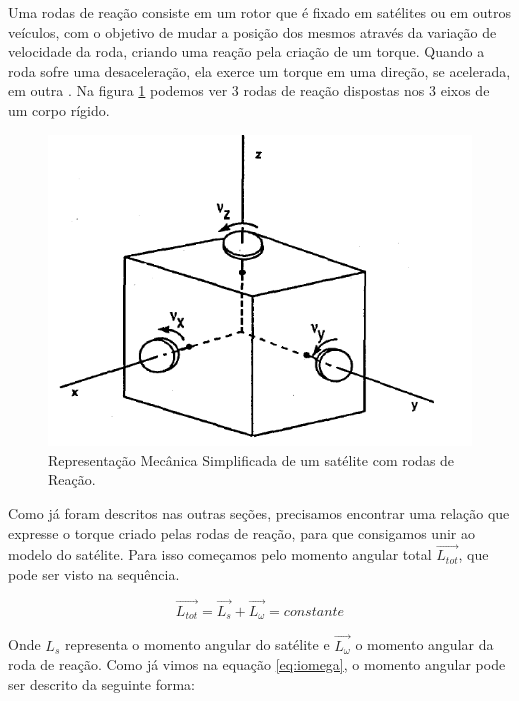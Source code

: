 Uma rodas de reação consiste em um rotor que é fixado em satélites ou em outros veículos, com o objetivo de mudar a posição dos mesmos através da variação de velocidade da roda, criando uma reação pela criação de um torque. Quando a roda sofre uma desaceleração, ela exerce um torque em uma direção, se acelerada, em outra \cite{BongWie2001}. Na figura \ref{fig:satellite_controlhand_p1306} podemos ver 3 rodas de reação dispostas nos 3 eixos de um corpo rígido.

\begin{figure}[H]
  \caption{Representação Mecânica Simplificada de um satélite com rodas de Reação.}
  \begin{center}
      \includegraphics[scale=0.75]{img/satellite_controlhand_p1306}
  \end{center}
  \label{fig:satellite_controlhand_p1306}
\end{figure}

Como já foram descritos nas outras seções, precisamos encontrar uma relação que expresse o torque criado pelas rodas de reação, para que consigamos unir ao modelo do satélite. Para isso começamos pelo momento angular total $\vec{L_{tot}}$, que pode ser visto na sequência.

\begin{equation}\label{eq:ltot}
\vec{L_{tot}}=\vec{L_s}+\vec{L_{\omega}}=constante 
\end{equation}

Onde $L_s$ representa o momento angular do satélite e $\vec{L_{\omega}}$ o momento angular da roda de reação. Como já vimos na equação \ref{eq:iomega}, o momento angular pode ser descrito da seguinte forma:

